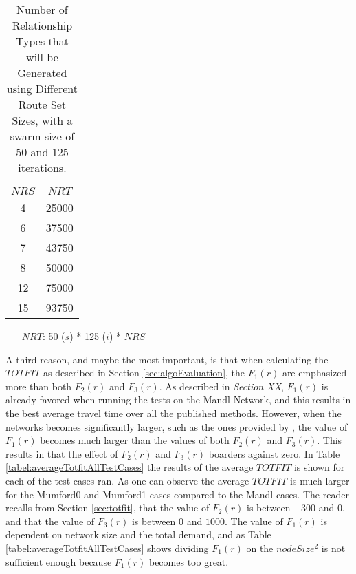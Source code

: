 \begin{table}[H]
    \centering
    \hspace*{-1.0cm}
    \begin{tabular}{|c|c|}
        \hline
        \textbf{$NRS$} & \textbf{$NRT$}\\
        \hline
        4 & 25000\\
        \hline
        6 & 37500\\
        \hline
        7 & 43750\\
        \hline
        8 & 50000\\
        \hline
        12 & 75000\\
        \hline
        15 & 93750\\
        \hline
    \end{tabular}
    \caption{Number of Relationship Types that will be Generated using Different Route Set Sizes, with a swarm size of 50 and 125 iterations.}
    \begin{itemize}[noitemsep]
    \item[$NRT$:] 50 ($s$) * 125 ($i$) * $NRS$
    \end{itemize} 
    \label{tabel:numberOfRelationshipTypes}
\end{table} 

A third reason, and maybe the most important, is that when calculating the $TOTFIT$ as described in Section \vref{sec:algoEvaluation}, the $F_1(r)$ are emphasized more than both $F_2(r)$ and $F_3(r)$. As described in \emph{\color{blue} Section XX}, $F_1(r)$ is already favored when running the tests on the Mandl Network, and this results in the best average travel time over all the published methods. However, when the networks becomes significantly larger, such as the ones provided by \citet{mumford13}, the value of $F_1(r)$ becomes much larger than the values of both $F_2(r)$ and $F_3(r)$. This results in that the effect of $F_2(r)$ and $F_3(r)$ boarders against zero. In Table \ref{tabel:averageTotfitAllTestCases} the results of the average $TOTFIT$ is shown for each of the test cases ran. As one can observe the average $TOTFIT$ is much larger for the Mumford0 and Mumford1 cases compared to the Mandl-cases. The reader recalls from Section \vref{sec:totfit}, that the value of $F_2(r)$ is between $-300$ and $0$, and that the value of $F_3(r)$ is between $0$ and $1000$. The value of $F_1(r)$ is dependent on network size and the total demand, and as Table \vref{tabel:averageTotfitAllTestCases} shows dividing $F_1(r)$ on the $nodeSize^2$ is not sufficient enough because $F_1(r)$ becomes too great. 

